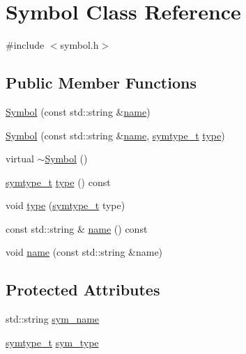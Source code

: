 \hypertarget{class_symbol}{\section{Symbol Class Reference}
\label{class_symbol}
}


{\ttfamily \#include $<$symbol.\-h$>$}

\subsection*{Public Member Functions}
\begin{DoxyCompactItemize}
\item 
\hyperlink{class_symbol_a918bcf3f530e98cc9d97cb16381db88f}{Symbol} (const std\-::string \&\hyperlink{class_symbol_a8324a8b8848a9bd1957b8d9e69335112}{name})
\item 
\hyperlink{class_symbol_a696ddf09a21f1a5a6dacac4e49da076e}{Symbol} (const std\-::string \&\hyperlink{class_symbol_a8324a8b8848a9bd1957b8d9e69335112}{name}, \hyperlink{symbol_8h_a07090a2a79cb68ad8d84e7ecd6558859}{symtype\-\_\-t} \hyperlink{class_symbol_afc6ea326ca57f6f9292a05a61f2df362}{type})
\item 
virtual \hyperlink{class_symbol_a505360ad4bd2e0bd1e3954eca1b05723}{$\sim$\-Symbol} ()
\item 
\hyperlink{symbol_8h_a07090a2a79cb68ad8d84e7ecd6558859}{symtype\-\_\-t} \hyperlink{class_symbol_afc6ea326ca57f6f9292a05a61f2df362}{type} () const 
\item 
void \hyperlink{class_symbol_a7822b485af2e735d462276836479ff24}{type} (\hyperlink{symbol_8h_a07090a2a79cb68ad8d84e7ecd6558859}{symtype\-\_\-t} type)
\item 
const std\-::string \& \hyperlink{class_symbol_a8324a8b8848a9bd1957b8d9e69335112}{name} () const 
\item 
void \hyperlink{class_symbol_a474363d0819a0acf6ecd1a547ec3f926}{name} (const std\-::string \&name)
\end{DoxyCompactItemize}
\subsection*{Protected Attributes}
\begin{DoxyCompactItemize}
\item 
std\-::string \hyperlink{class_symbol_a131f02876f25c9bdccbd71e1e7147989}{sym\-\_\-name}
\item 
\hyperlink{symbol_8h_a07090a2a79cb68ad8d84e7ecd6558859}{symtype\-\_\-t} \hyperlink{class_symbol_a4cb69009155bb4a73a86fc4004655a31}{sym\-\_\-type}
\end{DoxyCompactItemize}


